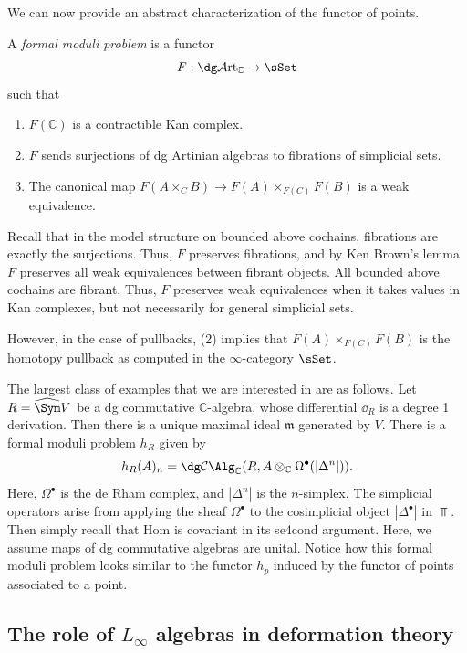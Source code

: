 We can now provide an abstract characterization of the functor of points.

\begin{definition}\label{dfn:10-2-4}
	A \emph{formal moduli problem} is a functor
	\[
		F : \dg \mathcal{A} \mathrm{rt}_{\mathbb{C} }  \to \sSet 
	\]
	such that
	\begin{enumerate}
		\item $F(\mathbb{C} )$ is a contractible Kan complex.
		\item $F$ sends surjections of dg Artinian algebras to fibrations of simplicial sets.
		\item The canonical map $F(A\times _CB)\to F(A)\times _{F(C)} F(B)$ is a weak equivalence.
	\end{enumerate}
\end{definition}

Recall that in the model structure on bounded above cochains, fibrations are exactly the surjections. Thus, $F$ preserves fibrations, and by Ken Brown's lemma $F$ preserves all weak equivalences between fibrant objects. All bounded above cochains are fibrant. Thus, $F$ preserves weak equivalences when it takes values in Kan complexes, but not necessarily for general simplicial sets.

However, in the case of pullbacks, (2) implies that $F(A)\times _{F(C)} F(B)$ is the homotopy pullback as computed in the $\infty $-category $\sSet $.

The largest class of examples that we are interested in are as follows. Let $R=\widehat{\Sym } V$ be a dg commutative $\mathbb{C} $-algebra, whose differential $\dd _R$ is a degree 1 derivation. Then there is a unique maximal ideal $\mathfrak{m} $ generated by $V$. There is a formal moduli problem $h_R$ given by
\[
	h_R(A)_n = \dg \mathcal{C} \Alg_{\mathbb{C}} (R,A\otimes_\mathbb{C} \Omega ^{\bullet} (\left| \Delta ^n \right| ))
.\]
Here, $\Omega ^{\bullet} $ is the de Rham complex, and $\left| \Delta ^n \right| $ is the $n$-simplex. The simplicial operators arise from applying the sheaf $\Omega ^{\bullet} $ to the cosimplicial object $\left| \Delta ^{\bullet}  \right| $ in $\Top $. Then simply recall that Hom is covariant in its se4cond argument. Here, we assume maps of dg commutative algebras are unital. Notice how this formal moduli problem looks similar to the functor $h_p$ induced by the functor of points associated to a point.

\subsection{The role of $L_\infty $ algebras in deformation theory}

